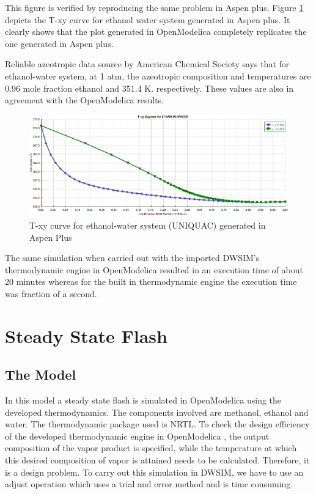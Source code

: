 \documentclass[12pt]{report}
\begin{document}
\begin{itemize}
This figure is verified by reproducing the same problem in Aspen plus. Figure \ref{aspen} depicts the T-xy curve for ethanol water system generated in Aspen plus. It clearly shows that the plot generated in OpenModelica completely replicates the one generated in Aspen plus. 

Reliable azeotropic data source by American Chemical Society \cite{Az} says that for ethanol-water system, at 1 atm, the azeotropic composition and temperatures are 0.96 mole fraction ethanol and 351.4 K. respectively. These values are also in agreement with the OpenModelica results.

\begin{figure}
\centering
\includegraphics[width=0.9\linewidth]{aspen}
\caption{T-xy curve for ethanol-water system (UNIQUAC) generated in Aspen Plus}
\label{aspen}
\end{figure}

The same simulation when carried out with the imported DWSIM's thermodynamic engine in OpenModelica resulted in an execution time of about 20 minutes whereas for the built in thermodynamic engine the execution time was fraction of a second.  

\end{itemize}
\section{Steady State Flash}
\subsection{The Model}
In this model a steady state flash is simulated in OpenModelica using the developed thermodynamics. The components involved are methanol, ethanol and water. The thermodynamic package used is NRTL. To check the design efficiency of the developed thermodynamic engine in OpenModelica , the output composition of the vapor product is specified, while the temperature at which this desired composition of vapor is attained needs to be calculated. Therefore, it is a design problem. To carry out this simulation in DWSIM, we have to use an adjust operation which uses a trial and error method and is time consuming.
\end{document}
